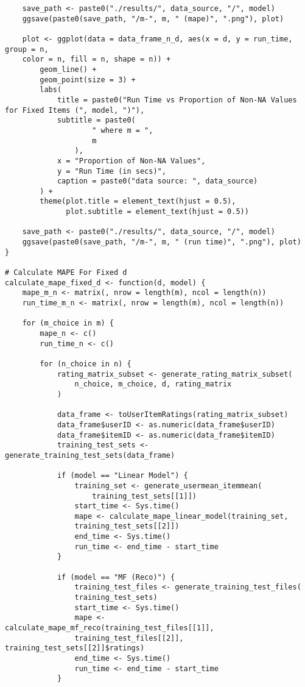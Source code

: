 \documentclass[12pt]{article}
\begin{document}
\begin{singlespace}
\begin{verbatim}
    save_path <- paste0("./results/", data_source, "/", model)
    ggsave(paste0(save_path, "/m-", m, " (mape)", ".png"), plot)

    plot <- ggplot(data = data_frame_n_d, aes(x = d, y = run_time, group = n,
    color = n, fill = n, shape = n)) +
        geom_line() +
        geom_point(size = 3) +
        labs(
            title = paste0("Run Time vs Proportion of Non-NA Values for Fixed Items (", model, ")"),
            subtitle = paste0(
                    " where m = ",
                    m
                ),
            x = "Proportion of Non-NA Values",
            y = "Run Time (in secs)",
            caption = paste0("data source: ", data_source)
        ) +
        theme(plot.title = element_text(hjust = 0.5),
              plot.subtitle = element_text(hjust = 0.5))

    save_path <- paste0("./results/", data_source, "/", model)
    ggsave(paste0(save_path, "/m-", m, " (run time)", ".png"), plot)
}

# Calculate MAPE For Fixed d
calculate_mape_fixed_d <- function(d, model) {
    mape_m_n <- matrix(, nrow = length(m), ncol = length(n))
    run_time_m_n <- matrix(, nrow = length(m), ncol = length(n))

    for (m_choice in m) {
        mape_n <- c()
        run_time_n <- c()

        for (n_choice in n) {
            rating_matrix_subset <- generate_rating_matrix_subset(
                n_choice, m_choice, d, rating_matrix
            )

            data_frame <- toUserItemRatings(rating_matrix_subset)
            data_frame$userID <- as.numeric(data_frame$userID)
            data_frame$itemID <- as.numeric(data_frame$itemID)
            training_test_sets <- generate_training_test_sets(data_frame)

            if (model == "Linear Model") {
                training_set <- generate_usermean_itemmean(
                    training_test_sets[[1]])
                start_time <- Sys.time()
                mape <- calculate_mape_linear_model(training_set,
                training_test_sets[[2]])
                end_time <- Sys.time()
                run_time <- end_time - start_time
            }

            if (model == "MF (Reco)") {
                training_test_files <- generate_training_test_files(
                training_test_sets)
                start_time <- Sys.time()
                mape <- calculate_mape_mf_reco(training_test_files[[1]],
                training_test_files[[2]], training_test_sets[[2]]$ratings)
                end_time <- Sys.time()
                run_time <- end_time - start_time
            }


\end{verbatim}
\end{singlespace}
\end{document}

